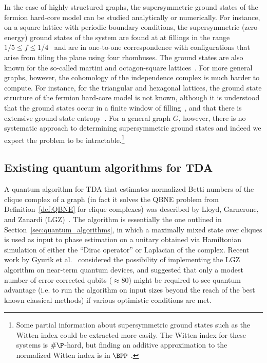 \documentclass[11pt]{article}
\numberwithin{equation}{section}
\renewcommand\( {\left(}
\renewcommand\) {\right)}
\begin{document}
In the case of highly structured graphs, the supersymmetric ground states of the fermion hard-core model can be studied analytically or numerically.
For instance, on a square lattice with periodic boundary conditions, the supersymmetric (zero-energy) ground states of the system are found at at fillings in the range $1/5 \leq f \leq 1/4$~\cite{huijse2009supersymmetry} and are in one-to-one correspondence with configurations that arise from tiling the plane using four rhombuses. The ground states are also known for the so-called martini and octagon-square lattices~\cite{fendley2005exact}. For more general graphs, however, the cohomology of the independence complex is much harder to compute. For instance, for the triangular and hexagonal lattices, the ground state structure of the fermion hard-core model is not known, although it is understood that the ground states occur in a finite window of filling~\cite{jonsson2010certain}, and that there is extensive ground state entropy~\cite{van2005extensive,Huijse:2011aa}. For a general graph $G$, however, there is no systematic approach to determining supersymmetric ground states and indeed we expect the problem to be intractable.\footnote{Some partial information about supersymmetric ground states such as the Witten index could be extracted more easily. The Witten index for these systems is $\#\P$-hard, but  finding an additive approximation to the normalized Witten index is in $\BPP$ \cite{Crichigno:2020vue}. } 
 



\subsection{Existing quantum algorithms for TDA}
\label{sec:Existing quantum algorithms for TDA}
A quantum algorithm for TDA that estimates normalized Betti numbers of the clique complex of a graph (in fact it solves the QBNE problem from Definition~\ref{def:QBNE} for clique complexes)  was described by Lloyd, Garnerone, and Zanardi (LGZ)~\cite{LloydetalTDA}. The algorithm is essentially the one outlined in Section~\ref{sec:quantum_algorithms}, in which a maximally mixed state over cliques is used as input to phase estimation on a unitary obtained via Hamiltonian simulation of either the ``Dirac operator'' or Laplacian of the complex. Recent work by Gyurik et al.~\cite{gyurik} considered the possibility of implementing the LGZ algorithm on near-term quantum devices, and suggested that only a modest number of error-corrected qubits ($\approx 80$) might be required to see quantum advantage (i.e. to run the algorithm on input sizes beyond the reach of the best known classical methods) if various optimistic conditions are met.
\end{document}
